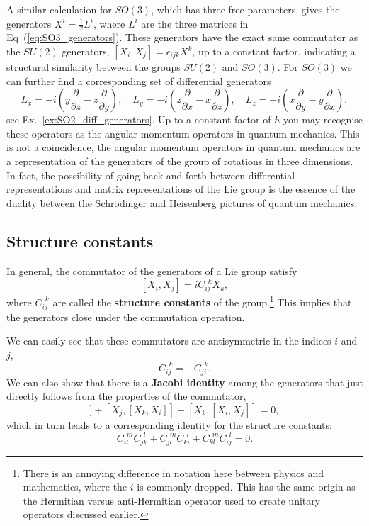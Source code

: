 \documentclass[notes.tex]{subfiles}
\begin{document}
A similar calculation for $SO(3)$, which has three free parameters, gives the generators $X^i=\frac{1}{2}L^i$, where $L^i$ are the three matrices in Eq~(\ref{eq:SO3_generators}). These generators have the exact same commutator as the $SU(2)$ generators, $[X_i,X_j]=\epsilon_{ijk}X^k$, up to a constant factor, indicating a structural similarity between the groups $SU(2)$ and $SO(3)$. For $SO(3)$ we can further find a corresponding set of differential generators
\begin{equation}
L_x=-i\left(y\frac{\partial}{\partial z}-z\frac{\partial}{\partial y} \right),\quad
L_y=-i\left(z\frac{\partial}{\partial x}-x\frac{\partial}{\partial z} \right),\quad
L_z=-i\left(x\frac{\partial}{\partial y}-y\frac{\partial}{\partial x} \right),
\label{eq:SO3_diff_generators}
\end{equation}
see Ex.~\ref{ex:SO2_diff_generators}.
Up to a constant factor of $\hbar$ you may recognise these operators as the angular momentum operators in quantum mechanics. This is not a coincidence, the angular momentum operators in quantum mechanics are a representation of the generators of the group of rotations in three dimensions. In fact, the possibility of going back and forth between differential representations and matrix representations of the Lie group is the essence of the duality between the Schr\"odinger and Heisenberg pictures of quantum mechanics.


\subsection{Structure constants}
\label{sec:structure_constants}

In general, the commutator of the generators of a Lie group satisfy \[[X_i,X_j]=iC_{ij}^{~~k}X_k,\] where  $C_{ij}^{~~k}$ are called the {\bf structure constants} of the group.\footnote{There is an annoying difference in notation here between physics and mathematics, where the $i$ is commonly dropped. This has the same origin as the Hermitian versus anti-Hermitian operator used to create unitary operators discussed earlier.} 
This implies that the generators close under the commutation operation.

We can easily see that these commutators are antisymmetric in the indices $i$ and $j$, 
\[C_{ij}^{~~k} = -C_{ji}^{~~k}.\]
We can also show that there is a {\bf Jacobi identity} among the generators that just directly follows from the properties of the commutator,
\begin{equation}
[X_i, [X_j, X_k]] + [X_j, [X_k, X_i]] + [X_k, [X_i, X_j]] = 0,
\label{eq:Jacobi_generators}
\end{equation}
which in turn leads to a corresponding identity for the structure constants:
\begin{equation}
C_{il}^{~~m}C_{jk}^{~~l} + C_{jl}^{~~m}C_{ki}^{~~l} + C_{kl}^{~~m}C_{ij}^{~~l} = 0.
\end{equation}
\end{document}
